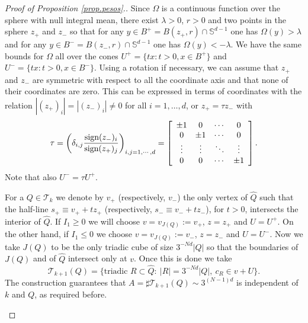 \documentclass[11pt]{amsart}
\theoremstyle{definition}
\begin{document}
\begin{proof}[Proof of Proposition \ref{prop.pesos}.]
Since $\Omega$ is a continuous function over the sphere with null integral mean, there exist $\lambda>0$, $r>0$ and two points in the sphere $z_+$ and $z_-$ so that for any $y\in B^+= B(z_+,r)\cap \mathbb S^{d-1}$ one has $\Omega(y)>\lambda$ and for any $y\in B^-=B(z_-,r)\cap \mathbb S^{d-1}$ one has $\Omega(y)<-\lambda$. We have the same bounds for $\Omega$ all over the cones $U^+=\{tx: t>0, x\in B^+\}$ and $U^-=\{tx: t>0, x\in B^-\}$. Using a rotation if necessary, we can assume that $z_+$ and $z_-$ are symmetric with respect to all the coordinate axis and that none of their coordinates are zero. This can be expressed in terms of coordinates with the relation $|(z_+)_i|=|(z_-)_i|\neq 0$ for all $i=1,\ldots,d$, or $z_+= \tau z_-$ with 
\[
\tau=\left(\delta_{i,j} \frac{{\mathop{\mbox{\normalfont sign}}\nolimits}(z_-)_i}{{\mathop{\mbox{\normalfont sign}}\nolimits}(z_+)_j}\right)_{i,j=1,\cdots,d}=\left[\begin{array}{cccc} \pm 1 & 0 & \cdots  & 0\\ 0&\pm 1&\cdots&0\\ \vdots&\vdots& \ddots& \vdots \\ 0&0&\cdots&\pm 1 \end{array}\right].
\]
Note that also $U^-=\tau U^+$.

\bigskip

For a $Q\in \mathcal T_{k}$ we denote by $v_+$ (respectively, $v_-$) the only vertex of $\widehat{Q}$ such that the half-line $s_+\equiv v_++t z_+$  (respectively, $s_-\equiv v_-+t z_-$), for $t>0$,  intersects the interior of $\widehat{Q}$. If $I_1\geq 0$ we will choose $v=v_{J(Q)}:=v_+$, $z=z_+$ and $U=U^+$. On the other hand, if $I_1\leq 0$ we choose $v=v_{J(Q)}:=v_-$, $z=z_-$ and $U=U^-$. Now we take $J(Q)$ to be the only triadic cube of size $3^{-Nd}|Q|$ so that the boundaries of $J(Q)$ and of $ \widehat{Q}$ intersect only at $v$. Once this is done we take 
\[
\mathcal T_{k+1}(Q)=\{\mbox{triadic } R\subset \widehat{Q} :\ |R|=3^{-Nd}|Q|,\ c_R \in v+U\}.
\]
The construction guarantees that $A=\sharp {\mathcal T}_{k+1}(Q)\sim 3^{(N-1)d}$ is independent of $k$ and $Q$, as required before.

\bigskip

\begin{center}
\end{center}
\end{proof}
\end{document}
